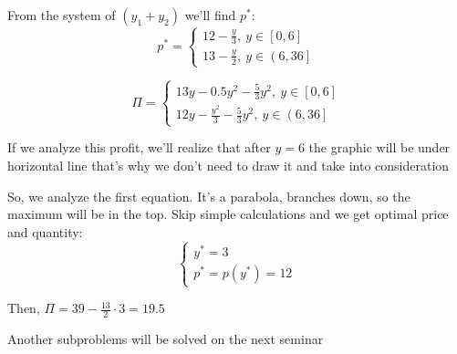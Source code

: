 \documentclass[a4paper, 10pt]{article}
\begin{document}
From the system of $(y_1+y_2)$ we'll find $p^*$:
\begin{equation*}
    p^*=\begin{cases}
    12 - \frac{y}{3},\ y\in \left[0,6\right] \\
    13-\frac{y}{2},\ y\in \left(6,36\right]
\end{cases}
\end{equation*}

\begin{equation*}
    \Pi=\begin{cases}
        13y-0.5y^2-\displaystyle\frac{5}{3}y^2,\ y\in\left[0,6\right]\\
        12y-\displaystyle\frac{y^2}{3}-\frac{5}{3}y^2,\ y\in\left(6,36\right]
    \end{cases}
\end{equation*}

If we analyze this profit, we'll realize that after $y=6$ the graphic will be under horizontal line that's why we don't need to draw it and take into consideration

So, we analyze the first equation. It's a parabola, branches down, so the maximum will be in the top. Skip simple calculations and we get optimal price and quantity:
\begin{equation*}
    \begin{cases}
        y^*=3\\
        p^*=p(y^*)=12
    \end{cases}
\end{equation*}

Then, $\Pi=39-\displaystyle\frac{13}{2}\cdot3=19.5$

Another subproblems will be solved on the next seminar
\end{document}
